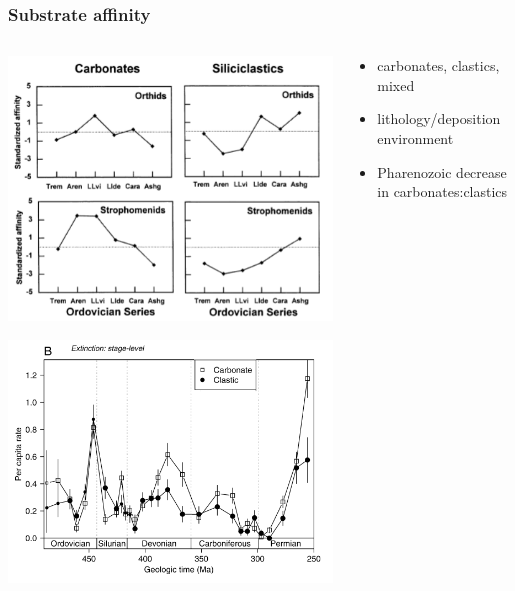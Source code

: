\documentclass{beamer} \usepackage{amsmath,amsthm}
\begin{document}
\begin{frame}
  \frametitle{Substrate affinity}

  \begin{columns}
    \begin{column}{0.5\textwidth}
      \begin{center}
        \includegraphics[height = 0.4\textheight, keepaspectratio = true]{figure/miller}
          
        \tiny{}

        \includegraphics[height = 0.4\textheight, keepaspectratio = true]{figure/foote}
          
        \tiny{}
      \end{center}
    \end{column}
    \begin{column}{0.5\textwidth}
      \begin{itemize}
        \item carbonates, clastics, mixed
        \item lithology/deposition environment
        \item Pharenozoic decrease in carbonates:clastics
      \end{itemize}
    \end{column}
  \end{columns}
\end{frame}
\end{document}
